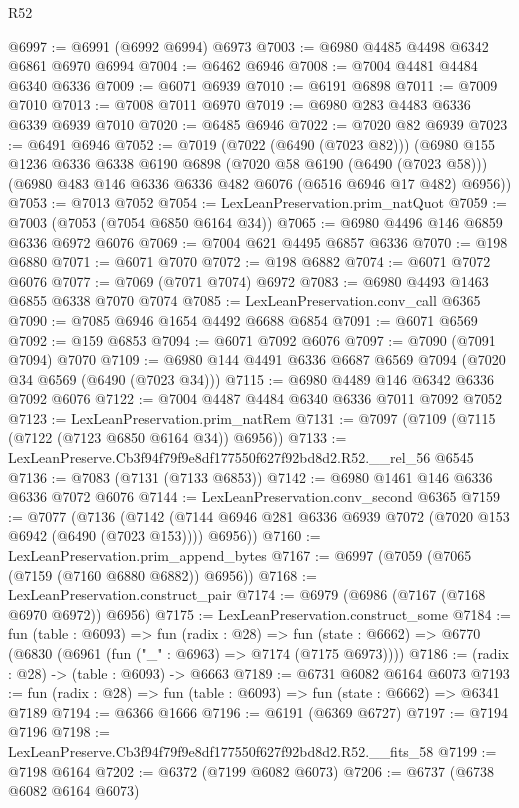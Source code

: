 \begin{lexlean}{R52}
\begin{coremodule}
@6997 := @6991 (@6992 @6994) @6973
@7003 := @6980 @4485 @4498 @6342 @6861 @6970 @6994
@7004 := @6462 @6946
@7008 := @7004 @4481 @4484 @6340 @6336
@7009 := @6071 @6939
@7010 := @6191 @6898
@7011 := @7009 @7010
@7013 := @7008 @7011 @6970
@7019 := @6980 @283 @4483 @6336 @6339 @6939 @7010
@7020 := @6485 @6946
@7022 := @7020 @82 @6939
@7023 := @6491 @6946
@7052 := @7019
    (@7022 (@6490 (@7023 @82)))
    (@6980
      @155
      @1236
      @6336
      @6338
      @6190
      @6898
      (@7020 @58 @6190 (@6490 (@7023 @58)))
      (@6980 @483 @146 @6336 @6336 @482 @6076 (@6516 @6946 @17 @482) @6956))
@7053 := @7013 @7052
@7054 := LexLeanPreservation.prim_natQuot
@7059 := @7003 (@7053 (@7054 @6850 @6164 @34))
@7065 := @6980 @4496 @146 @6859 @6336 @6972 @6076
@7069 := @7004 @621 @4495 @6857 @6336
@7070 := @198 @6880
@7071 := @6071 @7070
@7072 := @198 @6882
@7074 := @6071 @7072 @6076
@7077 := @7069 (@7071 @7074) @6972
@7083 := @6980 @4493 @1463 @6855 @6338 @7070 @7074
@7085 := LexLeanPreservation.conv_call @6365
@7090 := @7085 @6946 @1654 @4492 @6688 @6854
@7091 := @6071 @6569
@7092 := @159 @6853
@7094 := @6071 @7092 @6076
@7097 := @7090 (@7091 @7094) @7070
@7109 := @6980 @144 @4491 @6336 @6687 @6569 @7094 (@7020 @34 @6569 (@6490 (@7023 @34)))
@7115 := @6980 @4489 @146 @6342 @6336 @7092 @6076
@7122 := @7004 @4487 @4484 @6340 @6336 @7011 @7092 @7052
@7123 := LexLeanPreservation.prim_natRem
@7131 := @7097 (@7109 (@7115 (@7122 (@7123 @6850 @6164 @34)) @6956))
@7133 := LexLeanPreserve.Cb3f94f79f9e8df177550f627f92bd8d2.R52.__rel_56 @6545
@7136 := @7083 (@7131 (@7133 @6853))
@7142 := @6980 @1461 @146 @6336 @6336 @7072 @6076
@7144 := LexLeanPreservation.conv_second @6365
@7159 := @7077
    (@7136
      (@7142 (@7144 @6946 @281 @6336 @6939 @7072 (@7020 @153 @6942 (@6490 (@7023 @153)))) @6956))
@7160 := LexLeanPreservation.prim_append_bytes
@7167 := @6997 (@7059 (@7065 (@7159 (@7160 @6880 @6882)) @6956))
@7168 := LexLeanPreservation.construct_pair
@7174 := @6979 (@6986 (@7167 (@7168 @6970 @6972)) @6956)
@7175 := LexLeanPreservation.construct_some
@7184 := fun (table : @6093) =>
  fun (radix : @28) =>
  fun (state : @6662) => @6770 (@6830 (@6961 (fun ("_" : @6963) => @7174 (@7175 @6973))))
@7186 := (radix : @28) -> (table : @6093) -> @6663
@7189 := @6731 @6082 @6164 @6073
@7193 := fun (radix : @28) => fun (table : @6093) => fun (state : @6662) => @6341 @7189
@7194 := @6366 @1666
@7196 := @6191 (@6369 @6727)
@7197 := @7194 @7196
@7198 := LexLeanPreserve.Cb3f94f79f9e8df177550f627f92bd8d2.R52.__fits_58
@7199 := @7198 @6164
@7202 := @6372 (@7199 @6082 @6073)
@7206 := @6737 (@6738 @6082 @6164 @6073)

\end{coremodule}
\end{lexlean}

